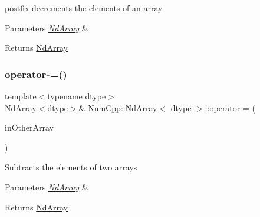 postfix decrements the elements of an array


\begin{DoxyParams}{Parameters}
{\em \mbox{\hyperlink{class_num_cpp_1_1_nd_array}{Nd\+Array}}} & \\
\hline
\end{DoxyParams}
\begin{DoxyReturn}{Returns}
\mbox{\hyperlink{class_num_cpp_1_1_nd_array}{Nd\+Array}} 
\end{DoxyReturn}
\mbox{\label{class_num_cpp_1_1_nd_array_aff0145b9754a80df6934caff08131e39}} 
\subsubsection{\texorpdfstring{operator-\/=()}{operator-=()}\hspace{0.1cm}{\footnotesize\ttfamily [1/2]}}
{\footnotesize\ttfamily template$<$typename dtype$>$ \\
\mbox{\hyperlink{class_num_cpp_1_1_nd_array}{Nd\+Array}}$<$dtype$>$\& \mbox{\hyperlink{class_num_cpp_1_1_nd_array}{Num\+Cpp\+::\+Nd\+Array}}$<$ dtype $>$\+::operator-\/= (\begin{DoxyParamCaption}\item[{const \mbox{\hyperlink{class_num_cpp_1_1_nd_array}{Nd\+Array}}$<$ dtype $>$ \&}]{in\+Other\+Array }\end{DoxyParamCaption})\hspace{0.3cm}{\ttfamily [inline]}}

Subtracts the elements of two arrays


\begin{DoxyParams}{Parameters}
{\em \mbox{\hyperlink{class_num_cpp_1_1_nd_array}{Nd\+Array}}} & \\
\hline
\end{DoxyParams}
\begin{DoxyReturn}{Returns}
\mbox{\hyperlink{class_num_cpp_1_1_nd_array}{Nd\+Array}} 
\end{DoxyReturn}
\mbox{\label{class_num_cpp_1_1_nd_array_a0623a6cffd97c49df7d34d5de335143b}} 
